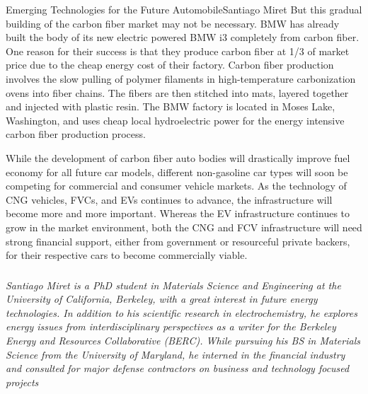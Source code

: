 \documentclass[10pt]{papertex}
\begin{document}
\begin{news}{2}{Emerging Technologies for the Future Automobile}{Santiago Miret}{}{}
But this gradual building of the carbon fiber market may not be necessary. BMW
has already built the body of its new electric powered BMW i3 completely from
carbon fiber. One reason for their success is that they produce carbon fiber at
1/3 of market price due to the cheap energy cost of their factory. Carbon fiber
production involves the slow pulling of polymer filaments in high-temperature
carbonization ovens into fiber chains. The fibers are then stitched into mats,
layered together and injected with plastic resin. The BMW factory is located in
Moses Lake, Washington, and uses cheap local hydroelectric power for the energy
intensive carbon fiber production process.

While the development of carbon fiber auto bodies will drastically improve fuel
economy for all future car models, different non-gasoline car types will soon be
competing for commercial and consumer vehicle markets. As the technology of CNG
vehicles, FVCs, and EVs continues to advance, the infrastructure will become
more and more important. Whereas the EV infrastructure continues to grow in the
market environment, both the CNG and FCV infrastructure will need strong
financial support, either from government or resourceful private backers, for
their respective cars to become commercially viable.

\subsubsection*{}

\emph{Santiago Miret is a PhD student in Materials Science and Engineering at
the University of California, Berkeley, with a great interest in future energy
technologies. In addition to his scientific research in electrochemistry, he
explores energy issues from interdisciplinary perspectives as a writer for the
Berkeley Energy and Resources Collaborative (BERC). While pursuing his BS in
Materials Science from the University of Maryland, he interned in the financial
industry and consulted for major defense contractors on business and technology
focused projects}

\end{news}
\end{document}
